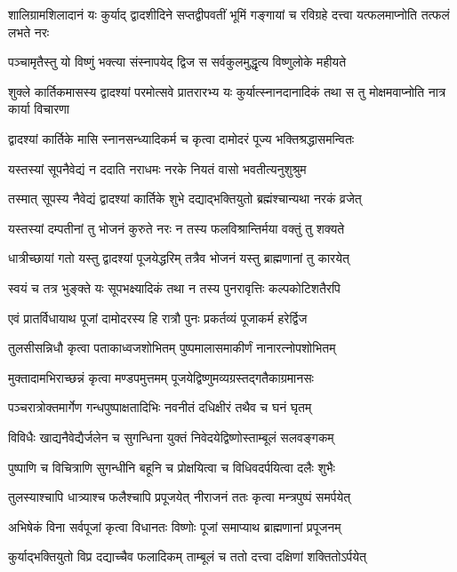 \threelineshloka
{शालिग्रामशिलादानं यः कुर्याद् द्वादशीदिने}
{सप्तद्वीपवतीं भूमिं गङ्गायां च रविग्रहे}
{दत्त्वा यत्फलमाप्नोति तत्फलं लभते नरः} %

\twolineshloka
{पञ्चामृतैस्तु यो विष्णुं भक्त्या संस्नापयेद् द्विज}
{स सर्वकुलमुद्धृत्य विष्णुलोके महीयते} %

\threelineshloka
{शुक्ले कार्तिकमासस्य द्वादश्यां परमोत्सवे}
{प्रातरारभ्य यः कुर्यात्स्नानदानादिकं तथा}
{स तु मोक्षमवाप्नोति नात्र कार्या विचारणा} %

\twolineshloka
{द्वादश्यां कार्तिके मासि स्नानसन्ध्यादिकर्म च}
{कृत्वा दामोदरं पूज्य भक्तिश्रद्धासमन्वितः} %

\twolineshloka
{यस्तस्यां सूपनैवेद्यं न ददाति नराधमः}
{नरके नियतं वासो भवतीत्यनुशुश्रुम} %

\twolineshloka
{तस्मात् सूपस्य नैवेद्यं द्वादश्यां कार्तिके शुभे}
{दद्याद्भक्तियुतो ब्रह्मंश्चान्यथा नरकं व्रजेत्} %

\twolineshloka
{यस्तस्यां दम्पतीनां तु भोजनं कुरुते नरः}
{न तस्य फलविश्रान्तिर्मया वक्तुं तु शक्यते} %

\twolineshloka
{धात्रीच्छायां गतो यस्तु द्वादश्यां पूजयेद्धरिम्}
{तत्रैव भोजनं यस्तु ब्राह्मणानां तु कारयेत्} %

\twolineshloka
{स्वयं च तत्र भुङ्क्ते यः सूपभक्ष्यादिकं तथा}
{न तस्य पुनरावृत्तिः कल्पकोटिशतैरपि} %

\twolineshloka
{एवं प्रातर्विधायाथ पूजां दामोदरस्य हि}
{रात्रौ पुनः प्रकर्तव्यं पूजाकर्म हरेर्द्विज} %

\twolineshloka
{तुलसीसन्निधौ कृत्वा पताकाध्वजशोभितम्}
{पुष्पमालासमाकीर्णं नानारत्नोपशोभितम्} %

\twolineshloka
{मुक्तादामभिराच्छन्नं कृत्वा मण्डपमुत्तमम्}
{पूजयेद्विष्णुमव्यग्रस्तद्गतैकाग्रमानसः} %

\twolineshloka
{पञ्चरात्रोक्तमार्गेण गन्धपुष्पाक्षतादिभिः}
{नवनीतं दधिक्षीरं तथैव च घनं घृतम्} %

\twolineshloka
{विविधैः खाद्यनैवेद्यैर्जलेन च सुगन्धिना}
{युक्तं निवेदयेद्विष्णोस्ताम्बूलं सलवङ्गकम्} %

\twolineshloka
{पुष्पाणि च विचित्राणि सुगन्धीनि बहूनि च}
{प्रोक्षयित्वा च विधिवदर्पयित्वा दलैः शुभैः} %

\twolineshloka
{तुलस्याश्चापि धात्र्याश्च फलैश्चापि प्रपूजयेत्}
{नीराजनं ततः कृत्वा मन्त्रपुष्पं समर्पयेत्} %

\twolineshloka
{अभिषेकं विना सर्वपूजां कृत्वा विधानतः}
{विष्णोः पूजां समाप्याथ ब्राह्मणानां प्रपूजनम्} %

\twolineshloka
{कुर्याद्भक्तियुतो विप्र दद्याच्चैव फलादिकम्}
{ताम्बूलं च ततो दत्त्वा दक्षिणां शक्तितोऽर्पयेत्} %

